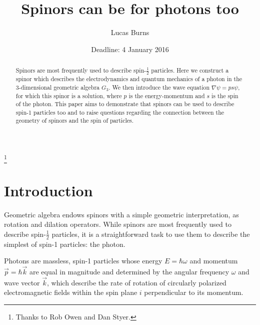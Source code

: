 \documentclass{birkjour}
\begin{document}
\title{Spinors can be for photons too}

\author{Lucas Burns} 
\address{
135 W Lorain St\\
OCMR 488\\
Oberlin, OH 44074 \\
USA}

\thanks{Thanks to Rob Owen and Dan Styer.}



\date{Deadline: 4 January 2016}

\begin{abstract}
  Spinors are most frequently used to describe spin-$\frac{1}{2}$ particles. Here we construct a spinor which describes the electrodynamics and quantum mechanics of a photon in the 3-dimensional geometric algebra $G_3$. We then introduce the wave equation $\nabla \psi = p s \psi$, for which this spinor is a solution, where $p$ is the energy-momentum and $s$ is the spin of the photon. This paper aims to demonstrate that spinors can be used to describe spin-1 particles too and to raise questions regarding the connection between the geometry of spinors and the spin of particles.
\end{abstract}

\maketitle

\section{Introduction}

Geometric algebra endows spinors with a simple geometric interpretation, as rotation and dilation operators. While spinors are most frequently used to describe spin-$\frac{1}{2}$ particles, it is a straightforward task to use them to describe the simplest of spin-1 particles: the photon.

Photons are massless, spin-1 particles whose energy $E = \hbar \omega$ and momentum $\vec p = \hbar \vec k$ are equal in magnitude and determined by the angular frequency $\omega$ and wave vector $\vec k$, which describe the rate of rotation of circularly polarized electromagnetic fields within the spin plane $i$ perpendicular to its momentum.
\end{document}
